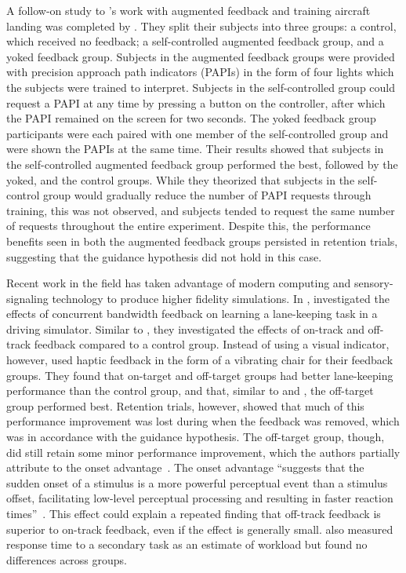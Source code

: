 A follow-on study to \citeauthor{doi:10.1177/001872088002200109}'s work with augmented feedback and training aircraft landing was completed by \citet{doi:10.1177/0018720809357343}.
They split their subjects into three groups: a control, which received no feedback; a self-controlled augmented feedback group, and a yoked feedback group.
Subjects in the augmented feedback groups were provided with precision approach path indicators (PAPIs) in the form of four lights which the subjects were trained to interpret.
Subjects in the self-controlled group could request a PAPI at any time by pressing a button on the controller, after which the PAPI remained on the screen for two seconds.
The yoked feedback group participants were each paired with one member of the self-controlled group and were shown the PAPIs at the same time.
Their results showed that subjects in the self-controlled augmented feedback group performed the best, followed by the yoked, and the control groups.
While they theorized that subjects in the self-control group would gradually reduce the number of PAPI requests through training, this was not observed, and subjects tended to request the same number of requests throughout the entire experiment.
Despite this, the performance benefits seen in both the augmented feedback groups persisted in retention trials, suggesting that the guidance hypothesis did not hold in this case.

Recent work in the field has taken advantage of modern computing and sensory-signaling technology to produce higher fidelity simulations.
In \citeyear{de_groot_effect_2011}, \citeauthor{de_groot_effect_2011} investigated the effects of concurrent bandwidth feedback on learning a lane-keeping task in a driving simulator.
Similar to \citeauthor{gordon_effect_1967}, they investigated the effects of on-track and off-track feedback compared to a control group.
Instead of using a visual indicator, however, \citeauthor{de_groot_effect_2011} used haptic feedback in the form of a vibrating chair for their feedback groups.
They found that on-target and off-target groups had better lane-keeping performance than the control group, and that, similar to \citeauthor{gordon_effect_1967} and \citeauthor{williams_-target_1962}, the off-target group performed best.
Retention trials, however, showed that much of this performance improvement was lost during when the feedback was removed, which was in accordance with the guidance hypothesis.
The off-target group, though, did still retain some minor performance improvement, which the authors partially attribute to the onset advantage~\citep{fischer_differential_2008}.
The onset advantage ``suggests that the sudden onset of a stimulus is a more powerful perceptual event than a stimulus offset, facilitating low-level perceptual processing and resulting in faster reaction times''~\citep{de_groot_effect_2011}.
This effect could explain a repeated finding that off-track feedback is superior to on-track feedback, even if the effect is generally small.
\citeauthor{de_groot_effect_2011} also measured response time to a secondary task as an estimate of workload but found no differences across groups.

